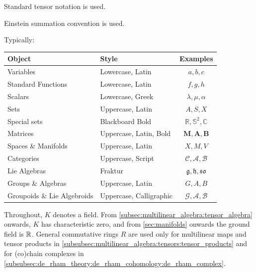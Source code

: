 \documentclass[a4paper,12pt]{article}
\begin{document}
Standard tensor notation is used.

Einstein summation convention is used.

Typically:

\begin{table}[!htbp]
\begin{tabular}{@{}llc@{}}
\toprule
Object                          & Style                   & Examples                                    \\ \midrule
Variables                       & Lowercase, Latin        & $a, b, c$                                   \\
Standard Functions              & Lowercase, Latin        & $f, g, h$                                   \\
Scalars                         & Lowercase, Greek        & $\lambda, \mu, \alpha$                      \\
Sets                            & Uppercase, Latin        & $A, S, X$                                   \\
Special sets                    & Blackboard Bold         & $\mathbb{R}, \mathbb{S}^2, \mathbb{C}$      \\
Matrices                        & Uppercase, Latin, Bold  & $\mathbf{M}, \mathbf{A}, \mathbf{B}$        \\
Spaces \& Manifolds             & Uppercase, Latin        & $X, M, V$                                   \\
Categories                      & Uppercase, Script       & $\mathscr{C}, \mathscr{A}, \mathscr{B}$     \\
Lie Algebras                    & Fraktur                 & $\mathfrak{g}, \mathfrak{h}, \mathfrak{so}$ \\
Groups \& Algebras              & Uppercase, Latin        & $G, A, B$                                   \\
Groupoids \& Lie Algebroids    & Uppercase, Calligraphic & $\mathcal{G}, \mathcal{A}, \mathcal{B}$     \\ \bottomrule
\end{tabular}
\end{table}

Throughout, $K$ denotes a field.
From \cref{subsec:multilinear_algebra:tensor_algebra} onwards, $K$ has characteristic zero, and from \cref{sec:manifolds} onwards the ground field is $\mathbb{R}$.
General commutative rings $R$ are used only for multilinear maps and tensor products in \cref{subsubsec:multilinear_algebra:tensors:tensor_products} and for (co)chain complexes in \cref{subsubsec:de_rham_theory:de_rham_cohomology:de_rham_complex}.
\end{document}
